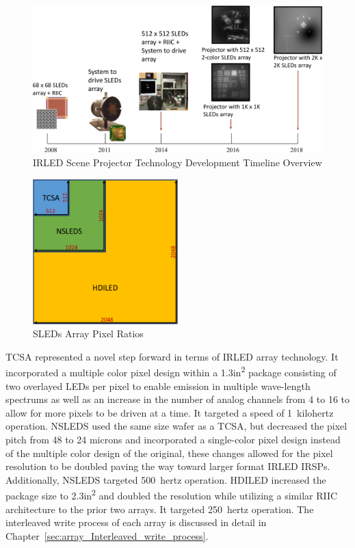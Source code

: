     \begin{figure}
        \centering
        \includegraphics[width=1.0\textwidth]{fig/sleds_timeline.pdf}
        \caption{IRLED Scene Projector Technology Development Timeline Overview}
        \label{fig:sleds_timeline}
    \end{figure}

    \begin{figure}
        \centering
        \includegraphics[width=0.5\textwidth]{fig/tcsa_nsleds_hdiled_array_ratio.pdf}
        \caption{SLEDs Array Pixel Ratios}
        \label{fig:tcsa_nsleds_hdiled_array_ratio}
    \end{figure}

    TCSA represented a novel step forward in terms of IRLED array technology. It incorporated a multiple color pixel design within a 1.3in\textsuperscript{2} package consisting of two overlayed LEDs per pixel to enable emission in multiple wave-length spectrums as well as an increase in the number of analog channels from 4 to 16 to allow for more pixels to be driven at a time. It targeted a speed of \mbox{1 kilohertz} operation. NSLEDS used the same size wafer as a TCSA, but decreased the pixel pitch from 48 to 24 microns and incorporated a single-color pixel design instead of the multiple color design of the original, these changes allowed for the pixel resolution to be doubled paving the way toward larger format IRLED IRSPs. Additionally, NSLEDS targeted \mbox{500 hertz} operation. HDILED increased the package size to 2.3in\textsuperscript{2} and doubled the resolution while utilizing a similar RIIC architecture to the prior two arrays. It targeted \mbox{250 hertz} operation. The interleaved write process of each array is discussed in detail in Chapter~\ref{sec:array_Interleaved_write_process}.

